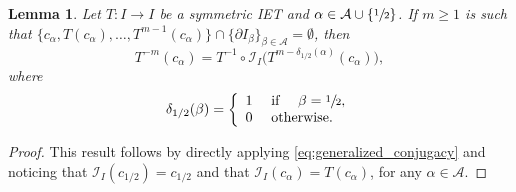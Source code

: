 \documentclass[10pt,a4paper]{article}
\theoremstyle{plain}
\newtheorem{lemma}[theorem]{Lemma}
\theoremstyle{definition}
\newcommand{\A}{\mathcal{A}}
\newcommand{\I}{\mathcal{I}}
\begin{document}
\begin{lemma}
\label{lem:inverse_iterates}
Let $T: I \to I$ be a symmetric IET and $\alpha \in \A \cup \{\sfrac{1}{2}\}$. If $m \geq 1$ is such that $\{c_\alpha, T(c_\alpha), \ldots, T^{m - 1}(c_\alpha)\} \cap \{\partial I_\beta\}_{\beta \in \A} = \emptyset$, then\vspace*{-3pt}
\begin{equation}
\label{eq:inverse_iterates}
T^{-m}(c_\alpha) =
{T^{-1} \circ \I_I} \big( T^{m - \delta_{1/2}(\alpha)}(c_\alpha) \big),
\end{equation}
where\vspace*{-3pt}
\begin{equation}
\label{eq:delta_1/2}
\delta_{1/2}(\beta) = \left\{\begin{array}{ll} 1 & \text{ if } \quad \beta = \sfrac{1}{2}, \\
0 & \text{ otherwise}.
\end{array} \right.
\end{equation}
\end{lemma}

\begin{proof}
This result follows by directly applying \eqref{eq:generalized_conjugacy} and noticing that $\I_I(c_{1/2}) = c_{1/2}$ and that $\I_I(c_\alpha) = T(c_\alpha)$, for any $\alpha \in \A$.
\end{proof}
\end{document}
